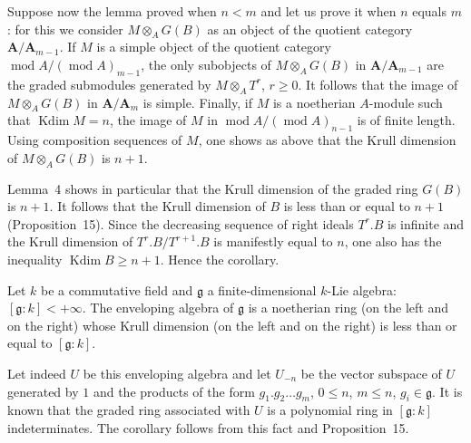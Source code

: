 Suppose now the lemma proved when $n<m$ and let us prove it when $n$
equals $m$: for this we consider $M\otimes_AG(B)$ as an object of the
quotient category $\mathbf{A}/\mathbf{A}_{m-1}$. If $M$ is a simple
object of the quotient category
$\operatorname{mod}A/(\operatorname{mod}A)_{m-1}$, the only subobjects
of $M\otimes_AG(B)$ in $\mathbf{A}/\mathbf{A}_{m-1}$ are the graded
submodules generated by $M\otimes_AT^r$, $r\ge0$. It follows that the
image of $M\otimes_AG(B)$ in $\mathbf{A}/\mathbf{A}_m$ is simple.
Finally, if $M$ is a noetherian $A$-module such that
$\operatorname{Kdim}M=n$, the image of $M$ in
$\operatorname{mod}A/(\operatorname{mod}A)_{n-1}$ is of finite length.
Using composition sequences of $M$, one shows as above that the Krull
dimension of $M\otimes_AG(B)$ is $n+1$.

Lemma~4 shows in particular that the Krull dimension of the graded
ring $G(B)$ is $n+1$. It follows that the Krull dimension of $B$ is
less than or equal to $n+1$ (Proposition~15). Since the decreasing
sequence of right ideals $T^r.B$ is infinite and the Krull dimension
of $T^r.B/T^{r+1}.B$ is manifestly equal to $n$, one also has the
inequality $\operatorname{Kdim}B\ge n+1$. Hence the corollary.

\begin{corollary}
Let $k$ be a commutative field and $\mathfrak{g}$ a
finite-dimensional $k$-Lie algebra:
$[\mathfrak{g}:k]<+\infty$. The enveloping algebra of $\mathfrak{g}$
is a noetherian ring (on the left and on the right) whose Krull
dimension (on the left and on the right) is less than or equal to
$[\mathfrak{g}:k]$.
\end{corollary}

Let indeed $U$ be this enveloping algebra and let $U_{-n}$ be the
vector subspace of $U$ generated by $1$ and the products of the form
$g_1.g_2\ldots g_m$, $0\le n$, $m\le n$, $g_i\in\mathfrak{g}$. It is
known that the graded ring associated with $U$ is a polynomial ring in
$[\mathfrak{g}:k]$ indeterminates. The corollary follows from this fact
and Proposition~15.
